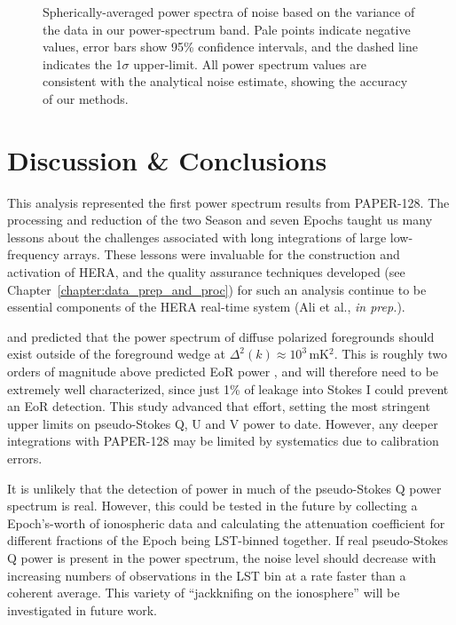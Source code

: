 \begin{figure}
\begin{tabular}{ll}
\end{tabular}
\caption[Spherically-averaged noise power spectra.]{Spherically-averaged power spectra of noise based on the variance of the data in our power-spectrum band. Pale points indicate negative values, error bars show 95\% confidence intervals, and the dashed line indicates the 1$\sigma$ upper-limit. All power spectrum values are consistent with the analytical noise estimate, showing the accuracy of our methods.}
\label{fig:psa128_power_spectra_noise}
\end{figure}

\section{Discussion \& Conclusions}
\label{sec:psa128_conc}

This analysis represented the first power spectrum results from PAPER-128. The processing and reduction of the two Season and seven Epochs taught us many lessons about the challenges associated with long integrations of large low-frequency arrays. These lessons were invaluable for the construction and activation of HERA, and the quality assurance techniques developed (see Chapter~\ref{chapter:data_prep_and_proc}) for such an analysis continue to be essential components of the HERA real-time system (Ali et al., \textit{in prep.}).

\cite{Nunhokee.17} and \cite{Asad.15} predicted that the power spectrum of diffuse polarized foregrounds should exist outside of the foreground wedge at $\Delta^2(k)\approx10^3$\,mK$^2$. This is roughly two orders of magnitude above predicted EoR power \citep{Lidz.07}, and will therefore need to be extremely well characterized, since just 1\% of leakage into Stokes I could prevent an EoR detection. This study advanced that effort, setting the most stringent upper limits on pseudo-Stokes Q, U and V power to date. However, any deeper integrations with PAPER-128 may be limited by systematics due to calibration errors. 

It is unlikely that the detection of power in much of the pseudo-Stokes Q power spectrum is real. However, this could be tested in the future by collecting a Epoch's-worth of ionospheric data and calculating the attenuation coefficient for different fractions of the Epoch being LST-binned together. If real pseudo-Stokes Q power is present in the power spectrum, the noise level should decrease with increasing numbers of observations in the LST bin at a rate faster than a coherent average. This variety of ``jackknifing on the ionosphere'' will be investigated in future work.\clearpage

